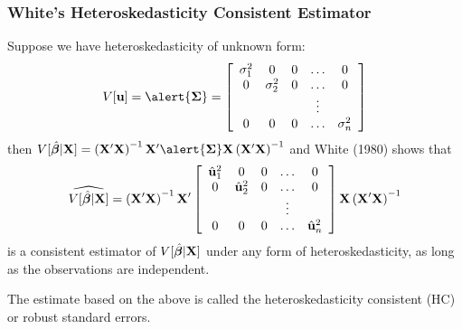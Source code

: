 \documentclass[xcolor=svgnames,9pt,english,aspectratio=169,t]{beamer}
\begin{document}
\begin{frame}[fragile]
\frametitle{White's Heteroskedasticity Consistent Estimator}
\begin{small}
Suppose we have \alert{heteroskedasticity of unknown form}:
$$
V[\u] = \alert{\bs{\Sigma}} =  \left[ \begin{array}{ccccc} \sigma_1^2 & 0 & 0 & \dots & 0 \\
0 & \sigma_2^2 & 0 & \dots & 0 \\
 & & & \vdots & \\
 0 & 0 & 0 & \dots & \sigma_n^2 \end{array} \right]
$$
\pause
then $V[\hat{\b}|\X] = \XXinv \X' \alert{\bs{\Sigma}} \X \XXinv$ and White (1980) shows that
\pause
$$\widehat{V[\hat{\boldsymbol{\beta}}|\mathbf{X}]}=
\left(\mathbf{X}'\mathbf{X}\right)^{-1} \mathbf{X}' \left[ \begin{array}{ccccc} \hat{\mathbf{u}}_1^2 & 0 & 0 & \dots & 0 \\
0 & \hat{\mathbf{u}}_2^2 & 0 & \dots & 0 \\
 & & & \vdots & \\
 0 & 0 & 0 & \dots & \hat{\mathbf{u}}_n^2 \end{array} \right] \mathbf{X} \left(\mathbf{X}'\mathbf{X}\right)^{-1}
$$
is a consistent estimator of $V[\hat{\boldsymbol{\beta}}|\mathbf{X}]$  \alert{under any form of heteroskedasticity}, as long as the observations are independent. \\
\medskip

The estimate based on the above is called the \alert{heteroskedasticity consistent (HC)} or
\alert{robust standard errors}.
\end{small}
\end{frame}
\end{document}
